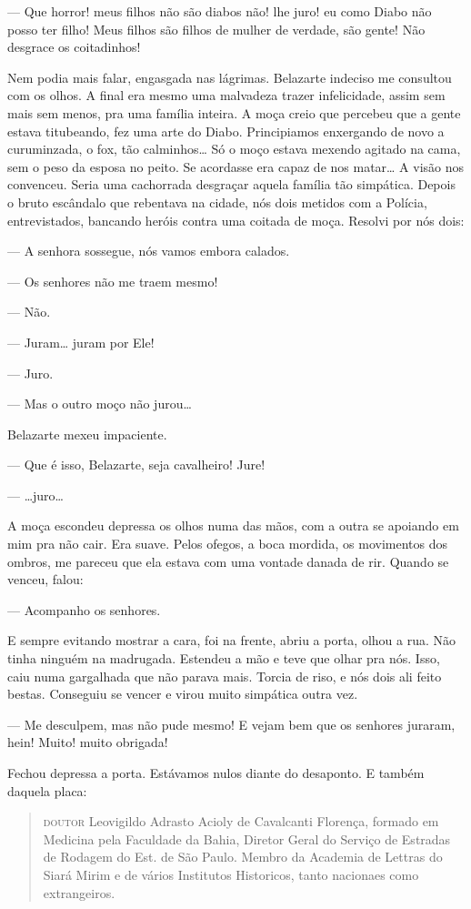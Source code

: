 --- Que horror! meus filhos não são diabos não! lhe juro! eu como Diabo
não posso ter filho! Meus filhos são filhos de mulher de verdade, são
gente! Não desgrace os coitadinhos!

Nem podia mais falar, engasgada nas lágrimas. Belazarte indeciso me
consultou com os olhos. A final era mesmo uma malvadeza trazer
infelicidade, assim sem mais sem menos, pra uma família inteira. A moça
creio que percebeu que a gente estava titubeando, fez uma arte do Diabo.
Principiamos enxergando de novo a curuminzada, o fox, tão calminhos\ldots{}
Só o moço estava mexendo agitado na cama, sem o peso da esposa no peito.
Se acordasse era capaz de nos matar\ldots{} A visão nos convenceu. Seria uma
cachorrada desgraçar aquela família tão simpática. Depois o bruto
escândalo que rebentava na cidade, nós dois metidos com a Polícia,
entrevistados, bancando heróis contra uma coitada de moça. Resolvi por
nós dois:

--- A senhora sossegue, nós vamos embora calados.

--- Os senhores não me traem mesmo!

--- Não.

--- Juram\ldots{} juram por Ele!

--- Juro.

--- Mas o outro moço não jurou\ldots{}

Belazarte mexeu impaciente.

--- Que é isso, Belazarte, seja cavalheiro! Jure!

--- \ldots{}juro\ldots{}

A moça escondeu depressa os olhos numa das mãos, com a outra se apoiando
em mim pra não cair. Era suave. Pelos ofegos, a boca mordida, os
movimentos dos ombros, me pareceu que ela estava com uma vontade danada
de rir. Quando se venceu, falou:

--- Acompanho os senhores.

E sempre evitando mostrar a cara, foi na frente, abriu a porta, olhou a
rua. Não tinha ninguém na madrugada. Estendeu a mão e teve que olhar pra
nós. Isso, caiu numa gargalhada que não parava mais. Torcia de riso, e
nós dois ali feito bestas. Conseguiu se vencer e virou muito simpática
outra vez.

--- Me desculpem, mas não pude mesmo! E vejam bem que os senhores
juraram, hein! Muito! muito obrigada!

Fechou depressa a porta. Estávamos nulos diante do desaponto. E também
daquela placa:

\begin{quote}
\textsc{doutor} Leovigildo Adrasto Acioly de Cavalcanti Florença, formado em
Medicina pela Faculdade da Bahia, Diretor Geral do Serviço de Estradas
de Rodagem do Est. de São Paulo. Membro da Academia de Lettras do Siará
Mirim e de vários Institutos Historicos, tanto nacionaes como
extrangeiros.
\end{quote}

